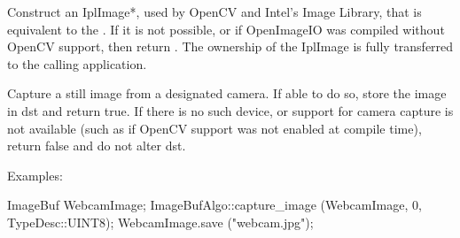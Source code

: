 \begin{comment}
\smallskip
\noindent Examples:
\begin{code}
\end{code}
\end{comment}
\apiend


 
Construct an {\cf IplImage*}, used by OpenCV and Intel's Image Library,
that is equivalent to the .  If it is not possible, or
if OpenImageIO was compiled without OpenCV support, then return
\NULL.  The ownership of the {\cf IplImage} is fully transferred to the
calling application.

\begin{comment}
\smallskip
\noindent Examples:
\begin{code}
\end{code}
\end{comment}
\apiend


 
Capture a still image from a designated camera.  If able to do so,
store the image in {\cf dst} and return {\cf true}.  If there is no such device,
or support for camera capture is not available (such as if OpenCV
support was not enabled at compile time), return {\cf false} and do not
alter {\cf dst}.

\smallskip
\noindent Examples:
\begin{code}
    ImageBuf WebcamImage;
    ImageBufAlgo::capture_image (WebcamImage, 0, TypeDesc::UINT8);
    WebcamImage.save ("webcam.jpg");
\end{code}
\apiend




\begin{comment}
\apiitem{bool {\ce blah} (ImageBuf \&dst, const ImageBuf \&src, \\
        \bigspc  ROI roi=ROI::All(), nthreads=0)}
\index{ImageBufAlgo!blah} \indexapi{blah}
Blah.
\smallskip
\noindent Examples:
\begin{code}
\end{code}
\apiend
\end{comment}


\chapwidthend
